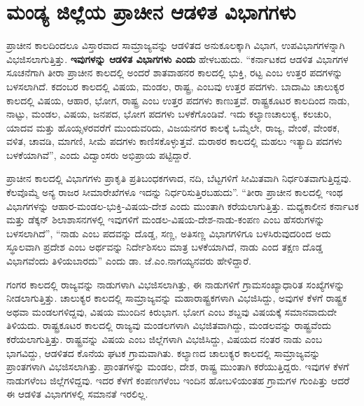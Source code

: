 \section{ಮಂಡ್ಯ ಜಿಲ್ಲೆಯ ಪ್ರಾಚೀನ ಆಡಳಿತ ವಿಭಾಗಗಳು}

ಪ್ರಾಚೀನ ಕಾಲದಿಂದಲೂ ವಿಸ್ತಾರವಾದ ಸಾಮ್ರಾಜ್ಯವನ್ನು ಆಡಳಿತದ ಅನುಕೂಲಕ್ಕಾಗಿ ವಿಭಾಗ, ಉಪವಿಭಾಗಗಳನ್ನಾಗಿ ವಿಭಜಿಸಲಾಗುತ್ತಿತ್ತು. \textbf{ಇವುಗಳನ್ನು ಆಡಳಿತ ವಿಭಾಗಗಳು ಎಂದು }ಹೇಳಬಹುದು. “ಕರ್ನಾಟಕದ ಆಡಳಿತ ವಿಭಾಗಗಳ ಸೂಚನೆಗಾಗಿ ತೀರಾ ಪ್ರಾಚೀನ ಕಾಲದಲ್ಲಿ ಅಂದರೆ ಶಾತವಾಹನರ ಕಾಲದಲ್ಲಿ ಭುಕ್ತಿ, ರಟ್ಟ ಎಂಬ ಉತ್ತರ ಪದಗಳನ್ನು ಬಳಸಲಾಗಿದೆ. ಕದಂಬರ ಕಾಲದಲ್ಲಿ ವಿಷಯ, ಮಂಡಲ, ರಾಷ್ಟ್ರ, ಎಂಬವು ಉತ್ತರ ಪದಗಳು. ಬಾದಾಮಿ ಚಾಲುಕ್ಯರ ಕಾಲದಲ್ಲಿ ವಿಷಯ, ಆಹಾರ, ಭೋಗ, ರಾಷ್ಟ್ರ ಎಂಬ ಉತ್ತರ ಪದಗಳು ಕಾಣುತ್ತವೆ. ರಾಷ್ಟ್ರಕೂಟರ ಕಾಲದಿಂದ ನಾಡು, ನಾಟ್ಟು, ಮಂಡಲ, ವಿಷಯ, ಜನಪದ, ಭೋಗ ಪದಗಳು ಬಳಕೆಗೊಂಡಿವೆ. ಇದು ಕಲ್ಯಾಣಚಾಲುಕ್ಯ, ಕಲಚುರಿ, ಯಾದವ ಮತ್ತು ಹೊಯ್ಸಳರವರೆಗೆ ಮುಂದುವರಿದು, ವಿಜಯನಗರ ಕಾಲಕ್ಕೆ ಒಮ್ಮೆಲೇ, ರಾಜ್ಯ, ವೇಂಠೆ, ವೇಂಠಕ, ವಳಿತ, ಚಾವಡಿ, ಮಾಗಣಿ, ಸೀಮೆ ಪದಗಳು ಕಾಣಿಸಕೊಳ್ಳುತ್ತವೆ. ಮರಾಠರ ಕಾಲದಲ್ಲಿ ಮಹಲು ಇತ್ಯಾದಿ ಪದಗಳು ಬಳಕೆಯಾಗಿವೆ”, ಎಂದು ವಿದ್ವಾಂಸರು ಅಭಿಪ್ರಾಯ ಪಟ್ಟಿದ್ದಾರೆ.

ಪ್ರಾಚೀನ ಕಾಲದಲ್ಲಿ ವಿಭಾಗಗಳು ಪ್ರಾಕೃತಿ ಪ್ರತಿಬಂಧಕಗಳಾದ, ನದಿ, ಬೆಟ್ಟಗಳಿಗೆ ಸೀಮಿತವಾಗಿ ನಿರ್ಧರಿತವಾಗು\-ತ್ತಿದ್ದವು. ಕೆಲವೊಮ್ಮೆ ಅನ್ಯ ರಾಜರ ಸೀಮಾರೇಖೆಗಳೂ ಇದನ್ನು ನಿರ್ಧರಿಸುತ್ತಿರಬಹುದು”. “ತೀರಾ ಪ್ರಾಚೀನ ಕಾಲದಲ್ಲಿ ಇಂಥ ವಿಭಾಗಗಳನ್ನು ಆಹಾರ-ಮಂಡಲ-ಭುಕ್ತಿ-ವಿಷಯ-ದೇಶ ಎಂದು ಮುಂತಾಗಿ ಕರೆಯಲಾಗುತ್ತಿತ್ತು. ಮಧ್ಯಕಾಲೀನ ಕರ್ನಾಟಕ ಮತ್ತು ಡೆಕ್ಕನ್​ ಶಿಲಾಶಾಸನಗಳಲ್ಲಿ ಇವುಗಳಿಗೆ ಮಂಡಲ-ವಿಷಯ-ದೇಶ-ನಾಡು-ಕಂಪಣ ಎಂಬ ಹೆಸರುಗಳನ್ನು ಬಳಸಲಾಗಿದೆ”, “ನಾಡು ಎಂಬ ಪದವನ್ನು ದೊಡ್ಡ, ಸಣ್ಣ, ಅತಿಸಣ್ಣ ವಿಭಾಗಗಳಿಗೂ ಬಳಸಿರುವುದರಿಂದ ಅದು ಸ್ಥೂಲವಾಗಿ ಪ್ರದೇಶ ಎಂಬ ಅರ್ಥವನ್ನು ನಿರ್ದೇಶಿಸಲು ಮಾತ್ರ ಬಳಕೆಯಾಗಿದೆ, ನಾಡು ಎಂದ ತಕ್ಷಣ ದೊಡ್ಡ ವಿಭಾಗವೆಂದು ತಿಳಿಯಬಾರದು” ಎಂದು ಡಾ. ಜೆ.ಎಂ.ನಾಗಯ್ಯನವರು ಹೇಳಿದ್ದಾರೆ.

ಗಂಗರ ಕಾಲದಲ್ಲಿ ರಾಜ್ಯವನ್ನು ನಾಡುಗಳಾಗಿ ವಿಭಜಿಸಲಾಗಿತ್ತು, ಈ ನಾಡುಗಳಿಗೆ ಗ್ರಾಮಸಂಖ್ಯಾಧಾರಿತ ಸಂಖ್ಯೆಗಳನ್ನು ನೀಡಲಾಗುತ್ತಿತ್ತು. ಚಾಲುಕ್ಯರ ಕಾಲದಲ್ಲಿ ಸಾಮ್ರಾಜ್ಯವನ್ನು ಮಹಾರಾಷ್ಟ್ರಕಗಳಾಗಿ ವಿಭಜಿಸಿದ್ದು, ಅವುಗಳ ಕೆಳಗೆ ರಾಷ್ಟ್ರಕ ಅಥವಾ ಮಂಡಲಗಳಿದ್ದವು, ವಿಷಯ ಮುಂದಿನ ಕಿರುಭಾಗ. ಭೋಗ ಎಂಬ ಶಬ್ದವು ವಿಷಯಕ್ಕೆ ಸಮಾನವಾದುದೇ ತಿಳಿಯದು. ರಾಷ್ಟ್ರಕೂಟರ ಕಾಲದಲ್ಲಿ ರಾಜ್ಯವು ಮಂಡಲಗಳಾಗಿ ವಿಭಜಿತವಾಗಿದ್ದು, ಮಂಡಲವನ್ನು ರಾಷ್ಟ್ರವೆಂದು ಕರೆಯಲಾಗುತ್ತಿತ್ತು. ರಾಷ್ಟ್ರವನ್ನು ವಿಷಯ ಎಂಬ ಜಿಲ್ಲೆಗಳಾಗಿ ವಿಭಜಿಸಿದ್ದು, ವಿಷಯದ ನಂತರ ನಾಡು ಎಂಬ ಭಾಗವಿದ್ದು, ಆಡಳಿತದ ಕೊನೆಯ ಘಟಕ ಗ್ರಾಮವಾಗಿತು. ಕಲ್ಯಾಣದ ಚಾಲುಕ್ಯರ ಕಾಲದಲ್ಲಿ ಸಾಮ್ರಾಜ್ಯವನ್ನು ಪ್ರಾಂತಗಳಾಗಿ ವಿಭಜಿಸಲಾಗಿತ್ತು. ಪ್ರಾಂತಗಳನ್ನು ಮಂಡಲ, ದೇಶ, ರಾಷ್ಟ್ರ ಮುಂತಾಗಿ ಕರೆಯುತ್ತಿದ್ದರು. ಇವುಗಳ ಕೆಳಗೆ ನಾಡುಗಳೆಂಬ ಜಿಲ್ಲೆಗಳಿದ್ದವು. ಇದರ ಕೆಳಗೆ ಕಂಪಣಗಳೆಂಬ ಇಂದಿನ ಹೋಬಳಿಯಂತಹ ಗ್ರಾಮಗಳ ಗುಂಪಿತ್ತು ಆದರೆ ಈ ಆಡಳಿತ ವಿಭಾಗಗಳಲ್ಲಿ ಸಮಾನತೆ ಇರಲಿಲ್ಲ.


